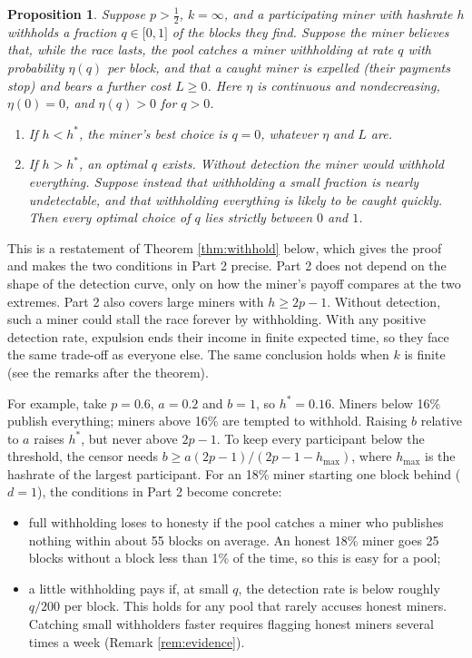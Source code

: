 \documentclass{article}%
\newtheorem{proposition}[theorem]{Proposition}
\begin{document}
\begin{proposition}
\label{prop:withhold}Suppose $p>\frac{1}{2}$, $k=\infty$, and a participating
miner with hashrate $h$ withholds a fraction $q\in\lbrack0,1]$ of the blocks
they find. Suppose the miner believes that, while the race lasts, the pool
catches a miner withholding at rate $q$ with probability $\eta(q)$ per block,
and that a caught miner is expelled (their payments stop) and bears a further
cost $L\geq0$. Here $\eta$ is continuous and nondecreasing, $\eta(0)=0$, and
$\eta(q)>0$ for $q>0$.

\begin{enumerate}
\item If $h<h^{\ast}$, the miner's best choice is $q=0$, whatever $\eta$ and
$L$ are.

\item If $h>h^{\ast}$, an optimal $q$ exists. Without detection the miner would
withhold everything. Suppose instead that withholding a small fraction is
nearly undetectable, and that withholding everything is likely to be caught
quickly. Then every optimal choice of $q$ lies strictly between $0$ and $1$.
\end{enumerate}
\end{proposition}

\noindent This is a restatement of Theorem \ref{thm:withhold} below, which
gives the proof and makes the two conditions in Part 2 precise. Part 2 does not
depend on the shape of the detection curve, only on how the miner's payoff
compares at the two extremes. Part 2 also covers large miners with
$h\geq2p-1$. Without detection, such a miner could stall the race forever by
withholding. With any positive detection rate, expulsion ends their income in
finite expected time, so they face the same trade-off as everyone else. The
same conclusion holds when $k$ is finite (see the remarks after the theorem).

For example, take $p=0.6$, $a=0.2$ and $b=1$, so $h^{\ast}=0.16$. Miners below
16\% publish everything; miners above 16\% are tempted to withhold. Raising
$b$ relative to $a$ raises $h^{\ast}$, but never above $2p-1$. To keep every
participant below the threshold, the censor needs
$b\geq a(2p-1)/(2p-1-h_{\max})$, where $h_{\max}$ is the hashrate of the
largest participant. For an 18\% miner starting one block behind ($d=1$), the
conditions in Part 2 become concrete:

\begin{itemize}
\item full withholding loses to honesty if the pool catches a miner who
publishes nothing within about 55 blocks on average. An honest 18\% miner goes
25 blocks without a block less than 1\% of the time, so this is easy for a pool;

\item a little withholding pays if, at small $q$, the detection rate is below
roughly $q/200$ per block. This holds for any pool that rarely accuses honest
miners. Catching small withholders faster requires flagging honest miners
several times a week (Remark \ref{rem:evidence}).
\end{itemize}
\end{document}
